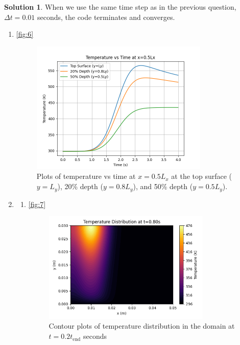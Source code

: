 \documentclass[12pt]{article}
\theoremstyle{definition} %
\newtheorem{solution}{Solution}
\theoremstyle{plain} %
\begin{document}
\begin{solution}
\noindent

When we use the same time step as in the previous question, $\Delta t=0.01$ seconds, the code terminates and converges.
     \begin{enumerate}
        \item \autoref{fig:6} \begin{figure}[htbp]
            \centering
            \includegraphics[width=0.8\textwidth]{classes/TAM-470/06-10/proj-2.3.1.png}
            \caption{Plots of temperature vs time at $x = 0.5L_x$ at the top surface ($y = L_y$), 20\% depth ($y = 0.8L_y$), and 50\% depth ($y = 0.5L_y$).}
            \label{fig:6}
        \end{figure}
        \item \begin{enumerate}
           \item  \autoref{fig:7} \begin{figure}[htbp]
            \centering
            \includegraphics[width=0.8\textwidth]{classes/TAM-470/06-10/proj-2.3.2.png}
            \caption{Contour plots of temperature distribution in the domain at $t = 0.2t_\text{end}$ seconds}

\end{figure}
\end{enumerate}
\end{enumerate}
\end{solution}
\end{document}
